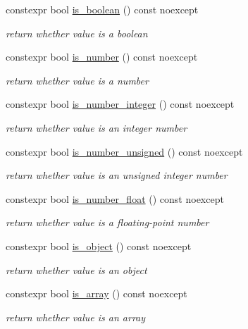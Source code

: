 \begin{DoxyCompactItemize}
constexpr bool \hyperlink{classnlohmann_1_1basic__json_a911b11e855e685fa59ea1d111490b36b}{is\+\_\+boolean} () const noexcept
\begin{DoxyCompactList}\small\item\em return whether value is a boolean \end{DoxyCompactList}\item 
constexpr bool \hyperlink{classnlohmann_1_1basic__json_abd47ac8eba63833152795280f75b5851}{is\+\_\+number} () const noexcept
\begin{DoxyCompactList}\small\item\em return whether value is a number \end{DoxyCompactList}\item 
constexpr bool \hyperlink{classnlohmann_1_1basic__json_ac4b4acf2c0ad075c0dc125a65c102362}{is\+\_\+number\+\_\+integer} () const noexcept
\begin{DoxyCompactList}\small\item\em return whether value is an integer number \end{DoxyCompactList}\item 
constexpr bool \hyperlink{classnlohmann_1_1basic__json_a5493f2ed1e07b0ece428bd5a47e2fb95}{is\+\_\+number\+\_\+unsigned} () const noexcept
\begin{DoxyCompactList}\small\item\em return whether value is an unsigned integer number \end{DoxyCompactList}\item 
constexpr bool \hyperlink{classnlohmann_1_1basic__json_a116cdb9300b56519fc9cf756609296cb}{is\+\_\+number\+\_\+float} () const noexcept
\begin{DoxyCompactList}\small\item\em return whether value is a floating-\/point number \end{DoxyCompactList}\item 
constexpr bool \hyperlink{classnlohmann_1_1basic__json_a57e8411a770a6263d6d8f2116c37f3aa}{is\+\_\+object} () const noexcept
\begin{DoxyCompactList}\small\item\em return whether value is an object \end{DoxyCompactList}\item 
constexpr bool \hyperlink{classnlohmann_1_1basic__json_ab5b70d60a636b9c5e10f6c8caac60b9e}{is\+\_\+array} () const noexcept
\begin{DoxyCompactList}\small\item\em return whether value is an array \end{DoxyCompactList}\item 

\end{DoxyCompactItemize}
